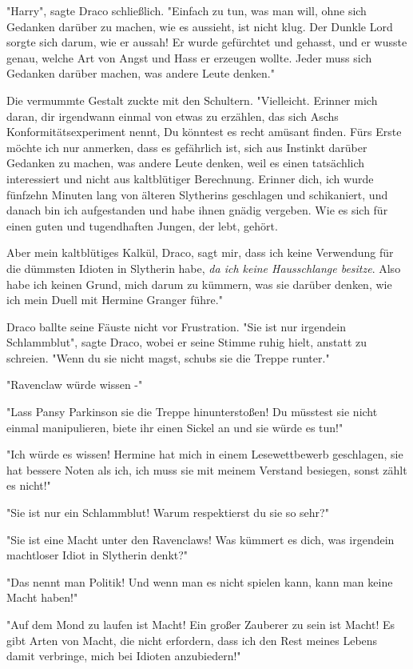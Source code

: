 {"Harry", sagte Draco schließlich. "Einfach zu tun, was man will, ohne sich Gedanken darüber zu machen, wie es aussieht, ist nicht klug. Der Dunkle Lord sorgte sich darum, wie er aussah! Er wurde gefürchtet und gehasst, und er wusste genau, welche Art von Angst und Hass er erzeugen wollte. Jeder muss sich Gedanken darüber machen, was andere Leute denken."

Die vermummte Gestalt zuckte mit den Schultern. "Vielleicht. Erinner mich daran, dir irgendwann einmal von etwas zu erzählen, das sich Aschs Konformitätsexperiment nennt, Du könntest es recht amüsant finden. Fürs Erste möchte ich nur anmerken, dass es gefährlich ist, sich aus Instinkt darüber Gedanken zu machen, was andere Leute denken, weil es einen tatsächlich interessiert und nicht aus kaltblütiger Berechnung. Erinner dich, ich wurde fünfzehn Minuten lang von älteren Slytherins geschlagen und schikaniert, und danach bin ich aufgestanden und habe ihnen gnädig vergeben. Wie es sich für einen guten und tugendhaften Jungen, der lebt, gehört.

Aber mein kaltblütiges Kalkül, Draco, sagt mir, dass ich keine Verwendung für die dümmsten Idioten in Slytherin habe, \emph{da ich keine Hausschlange besitze}. Also habe ich keinen Grund, mich darum zu kümmern, was sie darüber denken, wie ich mein Duell mit Hermine Granger führe."

Draco ballte seine Fäuste nicht vor Frustration. "Sie ist nur irgendein Schlammblut", sagte Draco, wobei er seine Stimme ruhig hielt, anstatt zu schreien. "Wenn du sie nicht magst, schubs sie die Treppe runter."

"Ravenclaw würde wissen -"

"Lass Pansy Parkinson sie die Treppe hinunterstoßen! Du müsstest sie nicht einmal manipulieren, biete ihr einen Sickel an und sie würde es tun!"

"Ich würde es wissen! Hermine hat mich in einem Lesewettbewerb geschlagen, sie hat bessere Noten als ich, ich muss sie mit meinem Verstand besiegen, sonst zählt es nicht!"

"Sie ist nur ein Schlammblut! Warum respektierst du sie so sehr?"

"Sie ist eine Macht unter den Ravenclaws! Was kümmert es dich, was irgendein machtloser Idiot in Slytherin denkt?"

"Das nennt man Politik! Und wenn man es nicht spielen kann, kann man keine Macht haben!"

"Auf dem Mond zu laufen ist Macht! Ein großer Zauberer zu sein ist Macht! Es gibt Arten von Macht, die nicht erfordern, dass ich den Rest meines Lebens damit verbringe, mich bei Idioten anzubiedern!"

}
